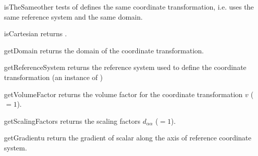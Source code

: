\begin{methoddesc}[CartesianCoordinateTransformation]{isTheSame}{other}
tests of  defines the same coordinate transformation, i.e. uses the same reference system and the same domain.
\end{methoddesc}


\begin{methoddesc}[CartesianCoordinateTransformation]{isCartesian}{}
returns \True.
\end{methoddesc}

\begin{methoddesc}[CartesianCoordinateTransformation]{getDomain}{}
returns the domain of the coordinate transformation.
\end{methoddesc}


\begin{methoddesc}[CartesianCoordinateTransformation]{getReferenceSystem}{}
returns the reference system used to define the coordinate transformation (an instance of )
\end{methoddesc}


\begin{methoddesc}[CartesianCoordinateTransformation]{getVolumeFactor}{}
returns the volume factor for the coordinate transformation $v$ ($=1$).
\end{methoddesc}


\begin{methoddesc}[CartesianCoordinateTransformation]{getScalingFactors}{}
returns the scaling factors $d_{\alpha \alpha}$ ($=1$).
\end{methoddesc}

\begin{methoddesc}[CartesianCoordinateTransformation]{getGradient}{u}
return the gradient of scalar  along the axis of
reference coordinate system.
\end{methoddesc}
